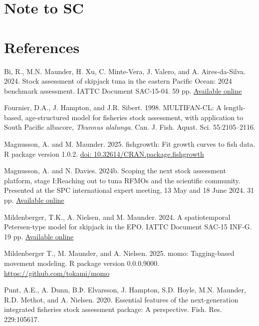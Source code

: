 \documentclass{SCreport}
\newcommand\blob
{https://github.com/PacificCommunity/ofp-sam-transition-plan/blob/main}
\newcommand\present{\blob/presentations}
\begin{document}
\section{Note to SC}

\section{References}

\sloppy\setlength{}

\begin{description}\setlength\itemsep{0ex}
  \item Bi, R., M.N. Maunder, H. Xu, C. Minte-Vera, J. Valero, and A.
  Aires-da-Silva. 2024. Stock assessment of skipjack tuna in the eastern Pacific
  Ocean: 2024 benchmark assessment. IATTC Document SAC-15-04. 59 pp.
  \href{https://www.iattc.org/GetAttachment/f57dece1-81ba-4771-8fa8-3362320a368%
    a/SAC-15-04_Skipjack-tuna-benchmark-assessment-2024.pdf}{Available online}
  \item Fournier, D.A., J. Hampton, and J.R. Sibert. 1998. MULTIFAN-CL: A
  length-based, age-structured model for fisheries stock assessment, with
  application to South Pacific albacore, \textit{Thunnus alalunga}. Can. J.
  Fish. Aquat. Sci. 55:2105--2116.
  \item Magnusson, A. and M. Maunder. 2025. fishgrowth: Fit growth curves to
  fish data. R package version 1.0.2.
  \href{https://doi.org/10.32614/CRAN.package.fishgrowth}
  {doi: 10.32614/CRAN.package.fishgrowth}
  \item Magnusson, A. and N. Davies. 2024b. Scoping the next stock assessment
  platform, stage I:\linebreak Reaching out to tuna RFMOs and the scientific
  community. Presented at the SPC international expert meeting, 13 May and 18
  June 2024. 31 pp.
  \href{\present/2024_05_13_experts_scoping/2024_05_13_experts_scoping.pdf}
  {Available online}
  \item Mildenberger, T.K., A. Nielsen, and M. Maunder. 2024. A spatiotemporal
  Petersen-type model for skipjack in the EPO. IATTC Document SAC-15 INF-G. 19
  pp. \href{https://www.iattc.org/GetAttachment/f8eacbc8-92b8-434d-a331-bdc733d%
    c1bc6/SAC-15-INF-G_Spatiotemporal-tagging-model-for-skipjack-in-the-EPO.pdf}
  {Available online}
  \item Mildenberger T., M. Maunder, and A. Nielsen. 2025. momo: Tagging-based
  movement modeling. R package version 0.0.0.9000.
  \href{https://github.com/tokami/momo}{https://github.com/tokami/momo}
  \item Punt, A.E., A. Dunn, B.Þ. Elvarsson, J. Hampton, S.D. Hoyle, M.N.
  Maunder, R.D. Methot, and A. Nielsen. 2020. Essential features of the
  next-generation integrated fisheries stock assessment package: A perspective.
  Fish. Res. 229:105617.
\end{description}
\end{document}
